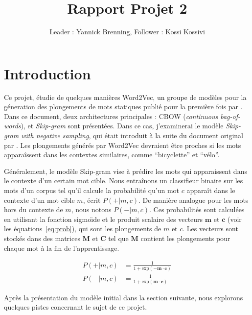 \documentclass[12pt]{article}
\title{Rapport Projet 2}
\author{Leader : Yannick Brenning, Follower : Kossi Kossivi}
\begin{document}
\maketitle

\vspace{0.5in}

\section{Introduction} \label{introduction}

Ce projet, étudie de quelques manières Word2Vec, un groupe de modèles pour la géneration des plongements de mots statiques publié pour la première fois par \cite{DBLP:journals/corr/abs-1301-3781}. Dans ce document, deux architectures principales : CBOW (\textit{continuous bag-of-words}), et \textit{Skip-gram} sont présentées. Dans ce cas, j'examinerai le modèle \textit{Skip-gram with negative sampling}, qui était introduit à la suite du document original par \cite{DBLP:conf/nips/MikolovSCCD13}. Les plongements générés par Word2Vec devraient être proches si les mots apparaîssent dans les contextes similaires, comme ``bicyclette'' et ``vélo''.

Généralement, le modèle Skip-gram vise à prédire les mots qui apparaissent dans le contexte d'un certain mot cible. Nous entraînons un classifieur binaire sur les mots d'un corpus tel qu'il calcule la probabilité qu'un mot $c$ apparaît dans le contexte d'un mot cible $m$, écrit $P(+|m, c)$. De manière analogue pour les mots hors du contexte de $m$, nous notons $P(-|m, c)$. Ces probabilités sont calculées en utilisant la fonction sigmo\"\i de et le produit scalaire des vecteurs $\mathbf{m} $ et $ \mathbf{c} $ (voir les équations~\ref{eq:prob}), qui sont les plongements de $m$ et $c$. Les vecteurs sont stockés dans des matrices $\mathbf{M}$ et $\mathbf{C}$ tel que $\mathbf{M}$ contient les plongements pour chaque mot à la fin de l'apprentissage.

\begin{equation}\label{eq:prob}
\begin{split}
    P(+|m, c) & = \frac{1}{1 + \text{exp}(-\mathbf{m} \cdot \mathbf{c})} \\
    P(-|m, c) & = \frac{1}{1 + \text{exp}(\mathbf{m} \cdot \mathbf{c})} 
\end{split}
\end{equation}

Après la présentation du modèle initial dans la section suivante, nous explorons quelques pistes concernant le sujet de ce projet.
\end{document}
